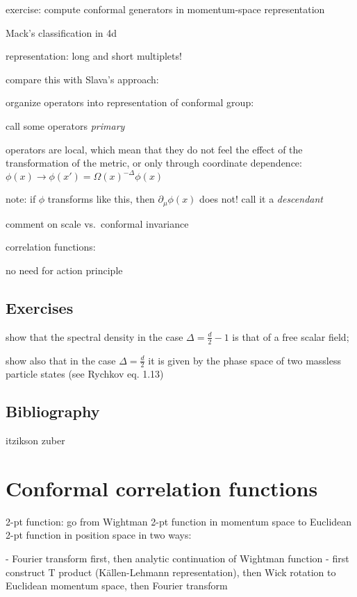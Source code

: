 \documentclass[a4paper,12pt]{article}
\numberwithin{equation}{section}
\begin{document}
exercise: compute conformal generators in momentum-space representation


Mack's classification in 4d


representation: long and short multiplets!




compare this with Slava's approach:

organize operators into representation of conformal group:

call some operators \emph{primary}

operators are local, which mean that they do not feel the effect of the transformation of the metric, or only through coordinate dependence:
$\phi(x) \to \phi(x') = \Omega(x)^{-\Delta} \phi(x)$

note: if $\phi$ transforms like this, then $\partial_\mu \phi(x)$ does not! call it a \emph{descendant}


comment on scale vs.~conformal invariance

correlation functions:

no need for action principle



\subsection{Exercises}

show that the spectral density in the case $\Delta = \frac{d}{2} - 1$ is that of a free scalar field;

show also that in the case $\Delta = \frac{d}{2}$ it is given by the phase space of two massless particle states (see Rychkov eq. 1.13)


\subsection{Bibliography}

itzikson zuber


\section{Conformal correlation functions}


2-pt function: go from Wightman 2-pt function in momentum space to Euclidean 2-pt function in position space in two ways:

- Fourier transform first, then analytic continuation of Wightman function
- first construct T product (Källen-Lehmann representation), then Wick rotation to Euclidean momentum space, then Fourier transform
\end{document}
